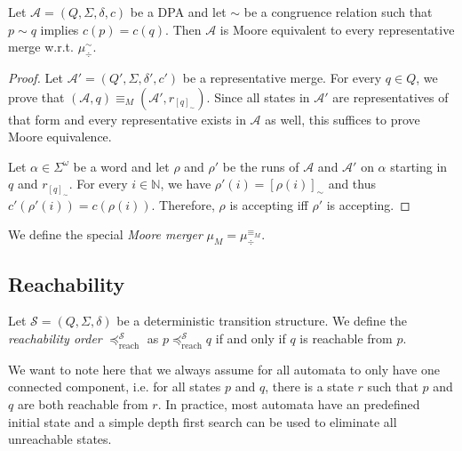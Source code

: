 \begin{lem}
\label{lem:general:congrel_prio_implies_moore}
	Let $\mathcal{A} = (Q, \Sigma, \delta, c)$ be a DPA and let $\sim$ be a congruence relation such that $p \sim q$ implies $c(p) = c(q)$. Then $\mathcal{A}$ is Moore equivalent to every representative merge w.r.t. $\mu_\div^\sim$.
\end{lem} 

\begin{proof} %
	Let $\mathcal{A}' = (Q', \Sigma, \delta', c')$ be a representative merge. For every $q \in Q$, we prove that $(\mathcal{A}, q) \equiv_M (\mathcal{A}', r_{[q]_\sim})$. Since all states in $\mathcal{A}'$ are representatives of that form and every representative exists in $\mathcal{A}$ as well, this suffices to prove Moore equivalence.
	
	Let $\alpha \in \Sigma^\omega$ be a word and let $\rho$ and $\rho'$ be the runs of $\mathcal{A}$ and $\mathcal{A}'$ on $\alpha$ starting in $q$ and $r_{[q]_\sim}$. For every $i \in \mathbb{N}$, we have $\rho'(i) = [\rho(i)]_\sim$ and thus $c'(\rho'(i)) = c(\rho(i))$. Therefore, $\rho$ is accepting iff $\rho'$ is accepting.
\end{proof}

\begin{defn}
	We define the special \emph{Moore merger} $\mu_M = \mu_\div^{\equiv_M}$.
\end{defn}

\vspace{5pt}





\subsection{Reachability}

\begin{defn}
	Let $\mathcal{S} = (Q, \Sigma, \delta)$ be a deterministic transition structure. We define the \emph{reachability order} $\preceq_\text{reach}^\mathcal{S}$ as $p \preceq_\text{reach}^\mathcal{S} q$ if and only if $q$ is reachable from $p$. 
\end{defn}

We want to note here that we always assume for all automata to only have one connected component, i.e. for all states $p$ and $q$, there is a state $r$ such that $p$ and $q$ are both reachable from $r$. In practice, most automata have an predefined initial state and a simple depth first search can be used to eliminate all unreachable states.

